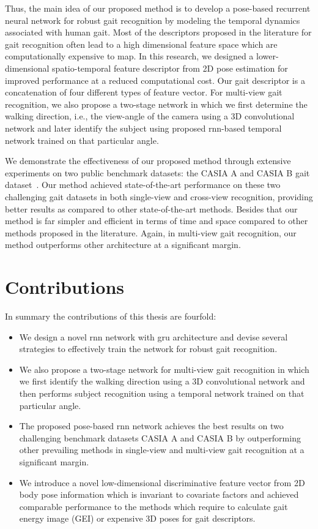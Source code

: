 Thus, the main idea of our proposed method is to develop a pose-based recurrent neural network for robust gait recognition by modeling the temporal dynamics associated with human gait. Most of the descriptors proposed in the literature for gait recognition often lead to a high dimensional feature space which are computationally expensive to map. In this research, we designed a lower-dimensional spatio-temporal feature descriptor from 2D pose estimation for improved performance at a reduced computational cost. Our gait descriptor is a concatenation of four different types of feature vector. For multi-view gait recognition, we also propose a two-stage network in which we first determine the walking direction, i.e., the view-angle of the camera using a 3D convolutional network and later identify the subject using proposed \gls{rnn}-based temporal network trained on that particular angle. 

We demonstrate the effectiveness of our proposed method through extensive experiments on two public benchmark datasets: the CASIA A and CASIA B gait dataset~\cite{Yu_06}. Our method achieved state-of-the-art performance on these two challenging gait datasets in both single-view and cross-view recognition, providing better results as compared to other state-of-the-art methods. Besides that our method is far simpler and efficient in terms of time and space compared to other methods proposed in the literature. Again, in multi-view gait recognition, our method outperforms other architecture at a significant margin. 



\section{Contributions}
In summary the contributions of this thesis are fourfold:
\begin{itemize}
\item We design a novel \gls{rnn} network with \gls{gru} architecture and devise several strategies to effectively train the network for robust gait recognition. 

\item We also propose a two-stage network for multi-view gait recognition in which we first identify the walking direction using a 3D convolutional network and then performs subject recognition using a temporal network trained on that particular angle.

\item The proposed pose-based \gls{rnn} network achieves the best results on two challenging benchmark datasets CASIA A and CASIA B by outperforming other prevailing methods in single-view and multi-view gait recognition at a significant margin.

\item We introduce a novel low-dimensional discriminative feature vector from 2D body pose information which is invariant to covariate factors and achieved comparable performance to the methods which require to calculate gait energy image (GEI) or expensive 3D poses for gait descriptors.
\end{itemize}


